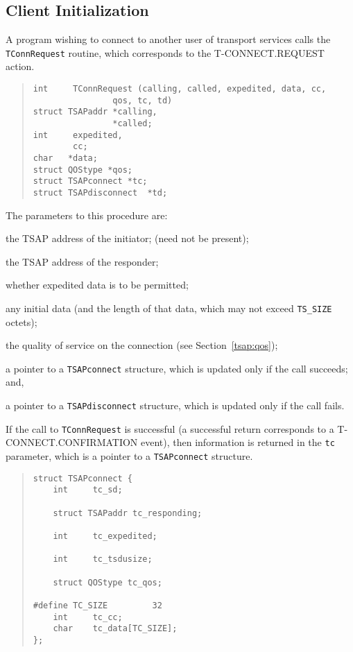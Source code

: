 \subsection	{Client Initialization}
A program wishing to connect to another user of transport services calls the
\verb"TConnRequest" routine,
which corresponds to the {\sf T-CONNECT.REQUEST\/} action.
\begin{quote}\small\begin{verbatim}
int     TConnRequest (calling, called, expedited, data, cc,
                qos, tc, td)
struct TSAPaddr *calling,
                *called;
int     expedited,
        cc;
char   *data;
struct QOStype *qos;
struct TSAPconnect *tc;
struct TSAPdisconnect  *td;
\end{verbatim}\end{quote}
The parameters to this procedure are:
\begin{describe}
\item[\verb"calling":] the TSAP address of the initiator;
(need not be present);

\item[\verb"called":] the TSAP address of the responder;

\item[\verb"expedited":] whether expedited data is to be permitted;

\item[\verb"data"/\verb"cc":] any initial data
(and the length of that data, which may not exceed \verb"TS_SIZE" octets);

\item[\verb"qos":] the quality of service on the connection
(see Section~\ref{tsap:qos});

\item[\verb"tc":] a pointer to a \verb"TSAPconnect" structure, which is
updated only if the call succeeds;
and,

\item[\verb"td":] a pointer to a \verb"TSAPdisconnect" structure, which is
updated only if the call fails.
\end{describe}
If the call to \verb"TConnRequest" is successful
(a successful return corresponds to a {\sf T-CONNECT.CONFIRMATION} event),
then information is returned in the \verb"tc" parameter,
which is a pointer to a \verb"TSAPconnect" structure.
\begin{quote}\small\begin{verbatim}
struct TSAPconnect {
    int     tc_sd;

    struct TSAPaddr tc_responding;

    int     tc_expedited;

    int     tc_tsdusize;

    struct QOStype tc_qos;

#define TC_SIZE         32
    int     tc_cc;
    char    tc_data[TC_SIZE];
};
\end{verbatim}\end{quote}
